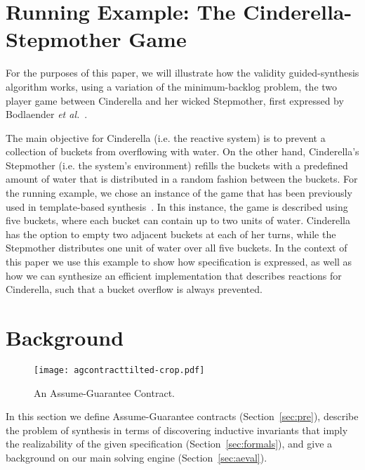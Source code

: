 \section{Running Example: The Cinderella-Stepmother Game}
\label{sec:example}

For the purposes of this paper, we will illustrate how the validity
guided-synthesis algorithm works, using a variation of the minimum-backlog
problem, the two player game between Cinderella and her wicked
Stepmother, first  expressed by Bodlaender \textit{et
al.}~\cite{bodlaender2012cinderella}.

The main objective for Cinderella (i.e. the reactive system) is to prevent a
collection of buckets from overflowing with water. On the other hand,
Cinderella's Stepmother (i.e. the system's environment) refills the buckets with a predefined amount of water that is distributed in a random fashion between the buckets.
For the running example, we chose an instance of the game that has been
previously used in template-based synthesis~\cite{beyene2014constraint}. In this instance, the game is described
using five buckets, where each bucket can contain up to two units of water.
Cinderella has the option to empty two adjacent buckets at each of her turns,
while the Stepmother distributes one unit of water over all five buckets. In the context of this paper we use this example to show how specification is expressed, as well as how we can synthesize an efficient implementation that describes reactions for Cinderella, such that a bucket overflow is always prevented.



\section{Background}
\label{sec:background}

\begin{figure}[!t]
\centering
\texttt{[image: agcontracttilted-crop.pdf]}
\caption{An Assume-Guarantee Contract.}
\label{fg:agcontract}
\end{figure}

\iffalse
In this section we define Assume-Guarantee contracts (Section~\ref{sec:pre}),
describe the problem of synthesis in terms of discovering inductive invariants that imply the realizability of the given specification (Section~\ref{sec:formals}), and give a background on our main solving engine (Section~\ref{sec:aeval}).

